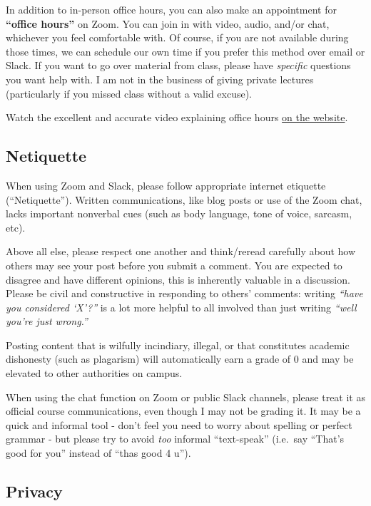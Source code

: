 \documentclass{article}
\begin{document}
In addition to in-person office hours, you can also make an appointment
for \textbf{``office hours''} on Zoom. You can join in with video,
audio, and/or chat, whichever you feel comfortable with. Of course, if
you are not available during those times, we can schedule our own time
if you prefer this method over email or Slack. If you want to go over
material from class, please have \emph{specific} questions you want help
with. I am not in the business of giving private lectures (particularly
if you missed class without a valid excuse).

Watch the excellent and accurate video explaining office hours
\href{https://gamef21.classes.ryansafner.com/syllabus/\#communication-email-slack-and-virtual-office-hours}{on
the website}.

\hypertarget{netiquette}{%
\subsection{Netiquette}\label{netiquette}}

When using Zoom and Slack, please follow appropriate internet etiquette
(``Netiquette''). Written communications, like blog posts or use of the
Zoom chat, lacks important nonverbal cues (such as body language, tone
of voice, sarcasm, etc).

Above all else, please respect one another and think/reread carefully
about how others may see your post before you submit a comment. You are
expected to disagree and have different opinions, this is inherently
valuable in a discussion. Please be civil and constructive in responding
to others' comments: writing \emph{``have you considered `X'?''} is a
lot more helpful to all involved than just writing \emph{``well you're
just wrong.''}

Posting content that is wilfully incindiary, illegal, or that
constitutes academic dishonesty (such as plagarism) will automatically
earn a grade of 0 and may be elevated to other authorities on campus.

When using the chat function on Zoom or public Slack channels, please
treat it as official course communications, even though I may not be
grading it. It may be a quick and informal tool - don't feel you need to
worry about spelling or perfect grammar - but please try to avoid
\emph{too} informal ``text-speak'' (i.e.~say ``That's good for you''
instead of ``thas good 4 u'').

\hypertarget{privacy}{%
\subsection{Privacy}\label{privacy}}
\end{document}
